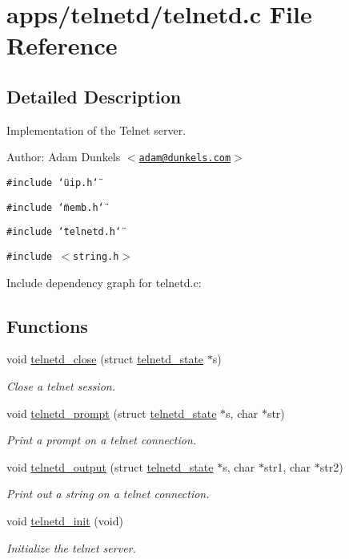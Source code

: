 \hypertarget{a00046}{
\section{apps/telnetd/telnetd.c File Reference}
\label{a00046}
}


\subsection{Detailed Description}
Implementation of the Telnet server. 

\begin{Desc}
\item[Author:]Adam Dunkels $<$\href{mailto:adam@dunkels.com}{\tt adam@dunkels.com}$>$ \end{Desc}


{\tt \#include \char`\"{}uip.h\char`\"{}}\par
{\tt \#include \char`\"{}memb.h\char`\"{}}\par
{\tt \#include \char`\"{}telnetd.h\char`\"{}}\par
{\tt \#include $<$string.h$>$}\par


Include dependency graph for telnetd.c:\subsection*{Functions}
\begin{CompactItemize}
\item 
void \hyperlink{a00081_g816bdc3e31e05e0979efe91a697b10ad}{telnetd\_\-close} (struct \hyperlink{a00027}{telnetd\_\-state} $\ast$s)
\begin{CompactList}\small\item\em Close a telnet session. \item\end{CompactList}\item 
void \hyperlink{a00081_g8873fd3ee516cfcca82cc4bc67f564c0}{telnetd\_\-prompt} (struct \hyperlink{a00027}{telnetd\_\-state} $\ast$s, char $\ast$str)
\begin{CompactList}\small\item\em Print a prompt on a telnet connection. \item\end{CompactList}\item 
void \hyperlink{a00081_g24ecabdebc734cb350bdd766c0cddf1c}{telnetd\_\-output} (struct \hyperlink{a00027}{telnetd\_\-state} $\ast$s, char $\ast$str1, char $\ast$str2)
\begin{CompactList}\small\item\em Print out a string on a telnet connection. \item\end{CompactList}\item 
void \hyperlink{a00081_g82ff99d50221f7c17df57dc6092ffc97}{telnetd\_\-init} (void)
\begin{CompactList}\small\item\em Initialize the telnet server. \item\end{CompactList}\end{CompactItemize}
